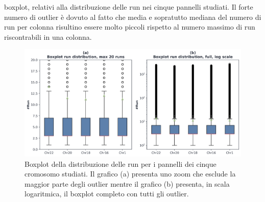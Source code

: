boxplot, relativi alla distribuzione delle run nei cinque pannelli
studiati. Il forte numero di outlier è dovuto al fatto che media e sopratutto
mediana del numero di run per colonna risultino essere molto piccoli rispetto al
numero massimo di run riscontrabili in una colonna.
\begin{figure}
  \centering
  \includegraphics[width = \linewidth]{img/boxplotbi.png}
  \caption{Boxplot della distribuzione delle run per i pannelli dei cinque
    cromosomo studiati. Il grafico (a) presenta uno zoom che esclude la maggior
    parte degli outlier mentre il grafico (b) presenta, in scala logaritmica, il
    boxplot completo con tutti gli outlier.}
  \label{fig:boxplot}
\end{figure}
